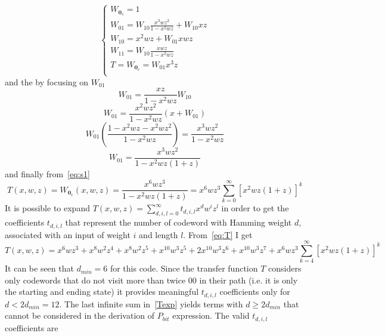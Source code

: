 \documentclass[10pt]{article}
\begin{document}
\begin{equation}
\begin{cases}
	W_{\mathbf{0}_s} = 1 \\ %
	W_{01} = W_{10}\frac{x^3wz^2}{1-x^2wz} + W_{10}xz \\
	W_{10} = x^2wz + W_{01}xwz \\
	W_{11} = W_{10}\frac{xwz}{1-x^2wz} \\
	T = W_{\mathbf{0}_e} = W_{01}x^3z\\
\end{cases}
\end{equation}
and the by focusing on $W_{01}$
\begin{equation*}
	W_{01} =  \frac{xz}{1-x^2wz}W_{10}
\end{equation*}
\begin{equation*}
	W_{01}  =  \frac{x^2wz^2}{1-x^2wz}(x + W_{01})
\end{equation*}
\begin{equation*}
	W_{01}\left(\frac{1 - x^2wz - x^2wz^2}{1-x^2wz} \right) = \frac{x^3wz^2}{1-x^2wz}
\end{equation*}
\begin{equation*}
	W_{01} = \frac{x^3wz^2}{1-x^2wz(1+z)}
\end{equation*}
and finally from~\eqref{eq:s1}
\begin{equation}\label{eq:T}
	T(x, w, z) = W_{\mathbf{0}_e}(x, w, z) = \frac{x^6wz^3}{1-x^2wz(1+z)} = x^6wz^3\sum_{k=0}^{\infty} [x^2wz(1+z)]^k
\end{equation}
It is possible to expand $T(x,w,z) = \sum_{d, i, l = 0}^{\infty} t_{d, i, l}x^dw^iz^l$ in order to get the coefficients $t_{d,i,l}$ that represent the number of codeword with Hamming weight $d$, associated with an input of weight $i$ and length $l$. From~\eqref{eq:T} I get
\begin{equation}\label{Texp}
	T(x, w, z) = x^6wz^3 + x^8w^2z^4 + x^8w^2z^5 + x^{10}w^3z^5 + 2x^{10}w^3z^6 + x^{10}w^3z^7 + x^6wz^3\sum_{k=4}^{\infty}[x^2wz(1+z)]^k
\end{equation}
It can be seen that $d_{min}=6$ for this code. Since the transfer function $T$ considers only codewords that do not visit more than twice $00$ in their path (i.e. it is only the starting and ending state) it provides meaningful $t_{d, i, l}$ coefficients only for $d < 2d_{min} = 12$. The last infinite sum in~\eqref{Texp} yields terms with $d \ge 2d_{min}$ that cannot be considered in the derivation of $P_{bit}$ expression. The valid $t_{d, i, l}$ coefficients are
\end{document}

